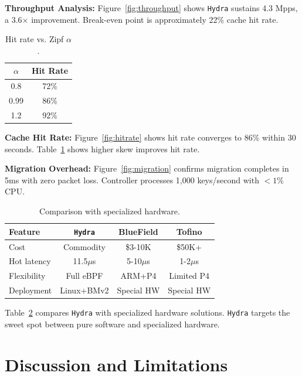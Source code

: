 \documentclass[sigconf,anonymous,10pt]{acmart}
\newcommand{\hydra}{\texttt{Hydra}}
\begin{document}
\textbf{Throughput Analysis:} Figure~\ref{fig:throughput} shows \hydra{} sustains 4.3 Mpps, a 3.6$\times$ improvement. Break-even point is approximately 22\% cache hit rate.

\begin{table}[t]
    \centering
    \caption{Hit rate vs. Zipf $\alpha$.}
    \label{tab:alpha}
    \begin{tabular}{cc}
        \toprule
        $\alpha$ & Hit Rate \\
        \midrule
        0.8 & 72\% \\
        0.99 & 86\% \\
        1.2 & 92\% \\
        \bottomrule
    \end{tabular}
\end{table}

\textbf{Cache Hit Rate:} Figure~\ref{fig:hitrate} shows hit rate converges to 86\% within 30 seconds. Table~\ref{tab:alpha} shows higher skew improves hit rate.

\textbf{Migration Overhead:} Figure~\ref{fig:migration} confirms migration completes in 5ms with zero packet loss. Controller processes 1,000 keys/second with $<1\%$ CPU.

\begin{table}[t]
    \centering
    \caption{Comparison with specialized hardware.}
    \label{tab:smartnic}
    \begin{tabular}{lccc}
        \toprule
        Feature & \hydra{} & BlueField & Tofino \\
        \midrule
        Cost & Commodity & \$3-10K & \$50K+ \\
        Hot latency & 11.5$\mu$s & 5-10$\mu$s & 1-2$\mu$s \\
        Flexibility & Full eBPF & ARM+P4 & Limited P4 \\
        Deployment & Linux+BMv2 & Special HW & Special HW \\
        \bottomrule
    \end{tabular}
\end{table}

Table~\ref{tab:smartnic} compares \hydra{} with specialized hardware solutions. \hydra{} targets the sweet spot between pure software and specialized hardware.

\section{Discussion and Limitations}
\label{sec:discuss}
\end{document}
